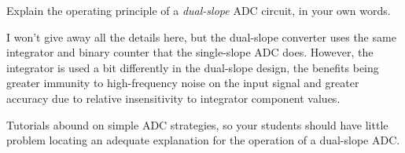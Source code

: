 

Explain the operating principle of a {\it dual-slope} ADC circuit, in your own words.







I won't give away all the details here, but the dual-slope converter uses the same integrator and binary counter that the single-slope ADC does.  However, the integrator is used a bit differently in the dual-slope design, the benefits being greater immunity to high-frequency noise on the input signal and greater accuracy due to relative insensitivity to integrator component values.







Tutorials abound on simple ADC strategies, so your students should have little problem locating an adequate explanation for the operation of a dual-slope ADC.




